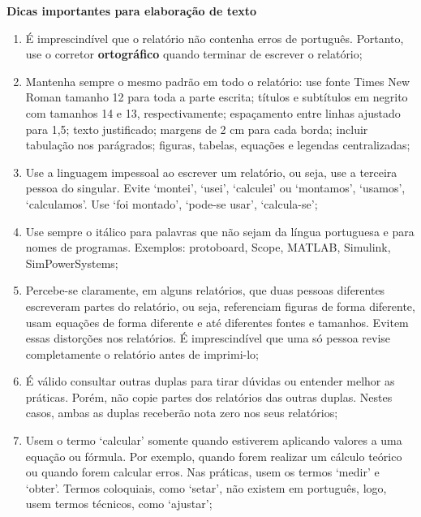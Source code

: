 \documentclass[12pt]{article}
\begin{document}
\begin{center}
  \textbf{\fontsize{14}{4}\selectfont Dicas importantes para elaboração de texto}
  \\
\end{center}

\begin{enumerate}
\item É imprescindível que o relatório não contenha erros de português. Portanto, use o corretor \textbf{ortográfico} quando terminar de escrever o relatório;

\item Mantenha sempre o mesmo padrão em todo o relatório: use fonte Times New Roman tamanho 12 para toda a parte escrita; títulos e subtítulos em negrito com tamanhos 14 e 13, respectivamente; espaçamento entre linhas ajustado para 1,5; texto justificado; margens de 2 cm para cada borda; incluir tabulação nos parágrados; figuras, tabelas, equações e legendas centralizadas;

\item Use a linguagem impessoal ao escrever um relatório, ou seja, use a terceira pessoa do singular. Evite ‘montei’, ‘usei’, ‘calculei’ ou ‘montamos’, ‘usamos’, ‘calculamos’. Use ‘foi montado’, ‘pode-se usar’, ‘calcula-se’;

\item Use sempre o itálico para palavras que não sejam da língua portuguesa e para nomes de programas. Exemplos: protoboard, Scope, MATLAB, Simulink, SimPowerSystems;

\item Percebe-se claramente, em alguns relatórios, que duas pessoas diferentes escreveram partes do relatório, ou seja, referenciam figuras de forma diferente, usam equações de forma diferente e até diferentes fontes e tamanhos. Evitem essas distorções nos relatórios. É imprescindível que uma só pessoa revise completamente o relatório antes de imprimi-lo;

\item É válido consultar outras duplas para tirar dúvidas ou entender melhor as práticas. Porém, não copie partes dos relatórios das outras duplas. Nestes casos, ambas as duplas receberão nota zero nos seus relatórios;

\item Usem o termo ‘calcular’ somente quando estiverem aplicando valores a uma equação ou fórmula. Por exemplo, quando forem realizar um cálculo teórico ou quando forem calcular erros. Nas práticas, usem os termos ‘medir’ e ‘obter’. Termos coloquiais, como ‘setar’, não existem em português, logo, usem termos técnicos, como ‘ajustar’;


\end{enumerate}
\end{document}

